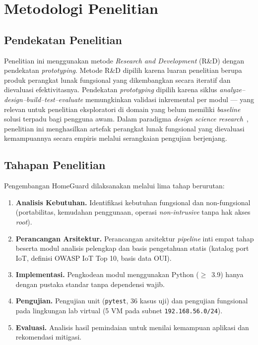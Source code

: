 \documentclass[conference]{IEEEtran}
\begin{document}
\section{Metodologi Penelitian}

\subsection{Pendekatan Penelitian}

Penelitian ini menggunakan metode \textit{Research and Development}
(R\&D) dengan pendekatan \textit{prototyping}. Metode R\&D dipilih
karena luaran penelitian berupa produk perangkat lunak fungsional yang
dikembangkan secara iteratif dan dievaluasi efektivitasnya. Pendekatan
\textit{prototyping} dipilih karena siklus
\textit{analyze--design--build--test--evaluate} memungkinkan validasi
inkremental per modul --- yang relevan untuk penelitian eksploratori di
domain yang belum memiliki \textit{baseline} solusi terpadu bagi pengguna
awam. Dalam paradigma \textit{design science research}~\cite{hevner2004},
penelitian ini menghasilkan artefak perangkat lunak fungsional yang
dievaluasi kemampuannya secara empiris melalui serangkaian pengujian
berjenjang.

\subsection{Tahapan Penelitian}

Pengembangan HomeGuard dilaksanakan melalui lima tahap berurutan:
\begin{enumerate}
  \item \textbf{Analisis Kebutuhan.} Identifikasi kebutuhan fungsional dan
        non-fungsional (portabilitas, kemudahan penggunaan, operasi
        \textit{non-intrusive} tanpa hak akses \textit{root}).
  \item \textbf{Perancangan Arsitektur.} Perancangan arsitektur
        \textit{pipeline} inti empat tahap beserta modul analisis pelengkap
        dan basis pengetahuan statis (katalog port IoT, definisi OWASP IoT
        Top 10, basis data OUI).
  \item \textbf{Implementasi.} Pengkodean modul menggunakan Python
        ($\geq$~3.9) hanya dengan pustaka standar tanpa dependensi wajib.
  \item \textbf{Pengujian.} Pengujian unit (\texttt{pytest}, 36 kasus uji)
        dan pengujian fungsional pada lingkungan lab virtual (5 VM pada
        subnet \texttt{192.168.56.0/24}).
  \item \textbf{Evaluasi.} Analisis hasil pemindaian untuk menilai
        kemampuan aplikasi dan rekomendasi mitigasi.
\end{enumerate}
\end{document}

